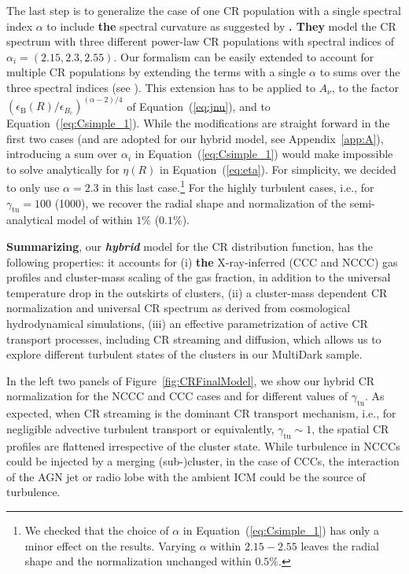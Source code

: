 \documentclass[traditabstract]{aa}
\def\C#1{{\bf #1}}
\newcommand{\rmn}{\mathrm}
\begin{document}
The last step is to generalize the case of one CR population with a single
spectral index $\alpha$ to include \C{the} spectral curvature as suggested by
\cite{2010MNRAS.409..449P}\C{. They} model the CR spectrum with three different
power-law CR populations with spectral indices of
$\alpha_{i}=(2.15,2.3,2.55)$. Our formalism can be easily extended to
account for multiple CR populations by extending the terms with a single
$\alpha$ to sums over the three spectral indices (see
\citealp{2010MNRAS.409..449P}). This extension has to be applied to $A_{\nu}$,
to the factor $(\epsilon_{\rmn{B}}(R)/ \epsilon_{B_{\rmn{c}}})^{(\alpha-2)/4}$
of Equation~(\ref{eq:jnu}), and to Equation~(\ref{eq:Csimple_1}). While the
modifications are straight forward in the first two cases (and are adopted for
our hybrid model, see Appendix~\ref{app:A}), introducing a sum over $\alpha_{i}$
in Equation~(\ref{eq:Csimple_1}) would make impossible to solve analytically for
$\eta(R)$ in Equation~(\ref{eq:eta}). For simplicity, we decided to only use
$\alpha = 2.3$ in this last case.\footnote{We checked that
  the choice of $\alpha$ in Equation~(\ref{eq:Csimple_1}) has only a minor
  effect on the results. Varying $\alpha$ within $2.15-2.55$ leaves the radial
  shape and the normalization unchanged within $0.5\%$.} For the highly
turbulent cases, i.e., for $\gamma_{\rmn{tu}}=100$ (1000), we recover the radial
shape and normalization of the semi-analytical model of
\cite{2010MNRAS.409..449P} within $1\%$ ($0.1\%$).

\C{Summarizing}, our \C{\emph{hybrid}} model for the CR distribution function, has the following properties:
it accounts for (i) \C{the} X-ray-inferred (CCC and NCCC) gas profiles and cluster-mass
scaling of the gas fraction, in addition to the universal temperature drop in
the outskirts of clusters, (ii) a cluster-mass dependent CR normalization and
universal CR spectrum as derived from cosmological hydrodynamical
simulations, (iii) an effective parametrization of active CR transport
processes, including CR streaming and diffusion, which allows us to explore
different turbulent states of the clusters in our MultiDark sample.

In the left two panels of Figure~\ref{fig:CRFinalModel}, we show our hybrid CR 
normalization for the NCCC and CCC cases and for different values of
$\gamma_{\rmn{tu}}$.  As expected, when CR streaming is the dominant CR
transport mechanism, i.e., for negligible advective turbulent transport or
equivalently, $\gamma_{\rmn{tu}}\sim1$, the spatial CR profiles are flattened
irrespective of the cluster state. While turbulence in NCCCs could be
injected by a merging (sub-)cluster, in the case of CCCs, the interaction of the
AGN jet or radio lobe with the ambient ICM could be the source of turbulence.
\end{document}
